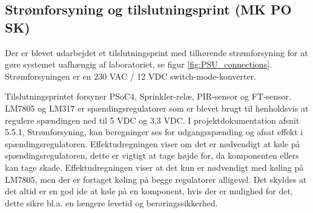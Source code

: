 \subsection{Strømforsyning og tilslutningsprint (MK PO SK)}

Der er blevet udarbejdet et tilslutningsprint med tilhørende strømforsyning for at gøre systemet uafhængig af laboratoriet, se figur \ref{fig:PSU_connections}. Strømforsyningen er en 230 VAC / 12 VDC switch-mode-konverter.


Tilslutningsprintet forsyner PSoC4, Sprinkler-relæ, PIR-sensor og FT-sensor. LM7805 og LM317 er spændingsregulatorer som er blevet brugt til henholdsvis at regulere spændingen ned til 5 VDC og 3,3 VDC. I projektdokumentation afsnit 5.5.1, Strømforsyning, kan beregninger ses for udgangsspænding og afsat effekt i spændingsregulatoren. Effektudregningen viser om det er nødvendigt at køle på spændingsregulatoren, dette er vigtigt at tage højde for, da komponenten ellers kan tage skade. Effektudregningen viser at det kun er nødvendigt med køling på LM7805, men der er fortaget køling på begge regulatorer alligevel. Det skyldes at det altid er en god ide at køle på en komponent, hvis der er mulighed for det, dette sikre bl.a. en længere levetid og berøringssikkerhed.

   
